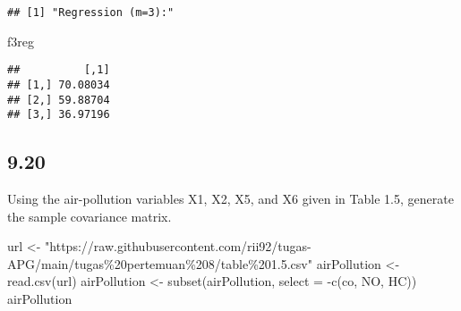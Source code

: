 \documentclass[
]{article}
\newenvironment{Shaded}{\begin{snugshade}}{\end{snugshade}}
\newcommand{\AttributeTok}[1]{\textcolor[rgb]{0.77,0.63,0.00}{#1}}
\newcommand{\FunctionTok}[1]{\textcolor[rgb]{0.00,0.00,0.00}{#1}}
\newcommand{\NormalTok}[1]{#1}
\newcommand{\OtherTok}[1]{\textcolor[rgb]{0.56,0.35,0.01}{#1}}
\newcommand{\SpecialCharTok}[1]{\textcolor[rgb]{0.00,0.00,0.00}{#1}}
\newcommand{\StringTok}[1]{\textcolor[rgb]{0.31,0.60,0.02}{#1}}
\begin{document}
\begin{verbatim}
## [1] "Regression (m=3):"
\end{verbatim}

\begin{Shaded}
\begin{Highlighting}[]
\NormalTok{f3reg}
\end{Highlighting}
\end{Shaded}

\begin{verbatim}
##          [,1]
## [1,] 70.08034
## [2,] 59.88704
## [3,] 36.97196
\end{verbatim}

\hypertarget{section-2}{%
\subsection{9.20}\label{section-2}}

Using the air-pollution variables X1, X2, X5, and X6 given in Table 1.5,
generate the sample covariance matrix.

\begin{Shaded}
\begin{Highlighting}[]
\NormalTok{url }\OtherTok{\textless{}{-}} \StringTok{"https://raw.githubusercontent.com/rii92/tugas{-}APG/main/tugas\%20pertemuan\%208/table\%201.5.csv"}
\NormalTok{airPollution }\OtherTok{\textless{}{-}} \FunctionTok{read.csv}\NormalTok{(url)}
\NormalTok{airPollution }\OtherTok{\textless{}{-}} \FunctionTok{subset}\NormalTok{(airPollution, }\AttributeTok{select =} \SpecialCharTok{{-}}\FunctionTok{c}\NormalTok{(co, NO, HC))}
\NormalTok{airPollution}
\end{Highlighting}
\end{Shaded}
\end{document}

